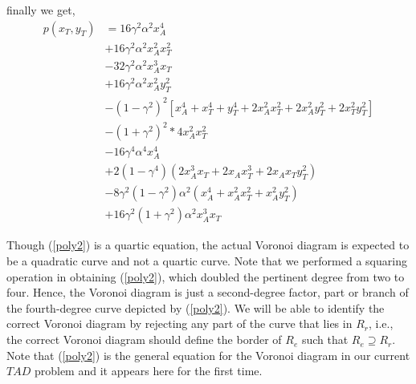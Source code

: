 \documentclass{beamer}
\begin{document}
\begin{frame}
finally we get,
\begin{equation}
\begin{split}
p(x_T,y_T)& = 16 \gamma^2 \alpha^2 x_A^4 \\
          &+ 16 \gamma^2 \alpha^2 x_A^2 x_T^2\\
          &- 32 \gamma^2 \alpha^2 x_A^3 x_T \\
          &+ 16 \gamma^2 \alpha^2 x_A^2 y_T^2 \\
          &- (1-\gamma^2)^2 [x_A^4 + x_T^4 + y_T^4 + 2 x_A^2 x_T^2 
          + 2 x_A^2 y_T^2  +  2 x_T^2 y_T^2 ] \\
          &- (1 + \gamma^2)^2 * 4 x_A^2 x_T^2 \\ 
          &- 16 \gamma^4 \alpha^4 x_A^4 \\
          &+ 2 (1 - \gamma^4) (2 x_A^3 x_T + 2 x_A x_T^3 + 2 x_A x_T y_T^2) \\ 
          &- 8 \gamma^2 (1 - \gamma^2) \alpha^2 (x_A^4 + x_A^2 x_T^2 + x_A^2 y_T^2) \\
          &+ 16 \gamma^2 (1 + \gamma^2) \alpha^2 x_A^3 x_T
          \end{split}
          \label{poly2}
\end{equation}
\end{frame}
\begin{frame}
Though (\ref{poly2}) is a quartic equation, the actual Voronoi diagram is expected to be a quadratic curve and not a quartic curve.
Note that we performed a squaring operation in obtaining (\ref{poly2}), which doubled the pertinent degree from two to four. Hence, the Voronoi diagram is just a second-degree factor, part or branch of the fourth-degree curve depicted by (\ref{poly2}). We will be able to identify the correct Voronoi diagram by rejecting any part of the curve that lies in $R_{r}$, i.e., the correct Voronoi diagram should define the border of $R_{e}$ such that $R_{e}\supseteq R_{r}$.\\


Note that (\ref{poly2}) is the general equation for the Voronoi diagram in our current $TAD$ problem and it appears here for the first time.
\end{frame}
\end{document}
